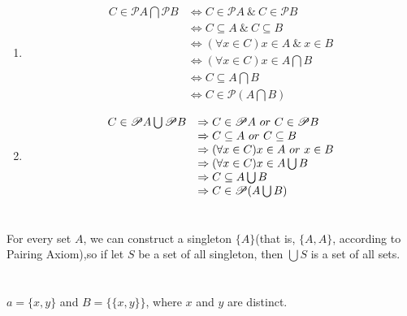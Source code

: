 \section{}
\begin{enumerate}
  \item
  \[ \begin{array}{rl}
  C \in \mathscr{P}A\bigcap\mathscr{P}B
  & \Leftrightarrow C \in \mathscr{P}A \ \&\ C \in \mathscr{P}B \\
  & \Leftrightarrow C \subseteq A \ \&\ C \subseteq B \\
  & \Leftrightarrow (\forall x \in C) x \in A \ \&\ x \in B  \\
  & \Leftrightarrow (\forall x \in C) x \in A\bigcap B \\
  & \Leftrightarrow C \subseteq A\bigcap B \\
  & \Leftrightarrow C \in \mathscr{P}(A\bigcap B)
  \end{array}\]

  \item
  \[ \begin{array}{rl}
  C \in \mathscr{P}A\bigcup\mathscr{P}B
  & \Rightarrow C \in \mathscr{P}A \ \mathnormal{or}\ C \in \mathscr{P}B \\
  & \Rightarrow C \subseteq A \ \mathnormal{or}\ C \subseteq B \\
  & \Rightarrow (\forall x \in C) x \in A \ \mathnormal{or}\ x \in B  \\
  & \Rightarrow (\forall x \in C) x \in A\bigcup B \\
  & \Rightarrow C \subseteq A\bigcup B \\
  & \Rightarrow C \in \mathscr{P}(A\bigcup B)
  \end{array}\]
\end{enumerate}


\section{}
For every set $A$, we can construct a singleton $ \{A\} $(that is,
$\{A,A\}$, according to Pairing Axiom),so if let $S$ be a set of all
singleton, then $ \bigcup S $ is a set of all sets.


\section{}
$ a = \{x, y\} $ and $ B = \{\{x, y\}\} $, where $x$ and $y$ are distinct.


